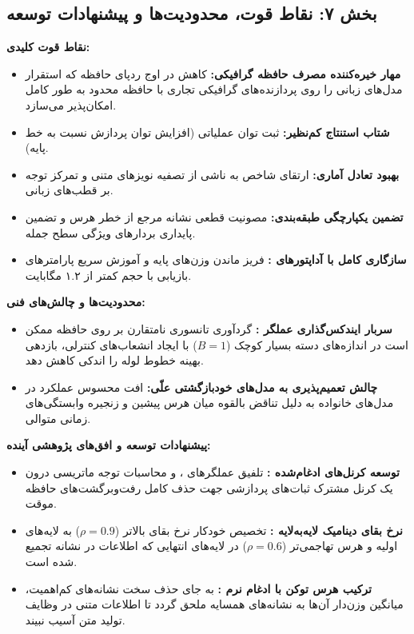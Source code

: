 \subsection*{بخش ۷: نقاط قوت، محدودیت‌ها و پیشنهادات توسعه }

\textbf{نقاط قوت کلیدی:}
\begin{itemize}
    \item \textbf{مهار خیره‌کننده مصرف حافظه گرافیکی:} کاهش  در اوج ردپای حافظه  که استقرار مدل‌های زبانی را روی پردازنده‌های گرافیکی تجاری با حافظه محدود  به طور کامل امکان‌پذیر می‌سازد.
    \item \textbf{شتاب استنتاج کم‌نظیر:} ثبت توان عملیاتی  (افزایش  توان پردازش نسبت به خط پایه).
    \item \textbf{بهبود تعادل آماری:} ارتقای شاخص  به  ناشی از تصفیه نویزهای متنی و تمرکز توجه بر قطب‌های زبانی.
    \item \textbf{تضمین یکپارچگی طبقه‌بندی:} مصونیت قطعی نشانه مرجع \lr{[CLS]} از خطر هرس و تضمین پایداری بردارهای ویژگی سطح جمله.
    \item \textbf{سازگاری کامل با آداپتورهای :} فریز ماندن وزن‌های پایه و آموزش سریع پارامترهای بازیابی با حجم کمتر از ۱.۲ مگابایت.
\end{itemize}

\textbf{محدودیت‌ها و چالش‌های فنی:}
\begin{itemize}
    \item \textbf{سربار ایندکس‌گذاری عملگر :} گردآوری تانسوری نامتقارن بر روی حافظه ممکن است در اندازه‌های دسته بسیار کوچک ($B=1$) با ایجاد انشعاب‌های کنترلی، بازدهی بهینه خطوط لوله  را اندکی کاهش دهد.
    \item \textbf{چالش تعمیم‌پذیری به مدل‌های خودبازگشتی علّی:} افت محسوس عملکرد در مدل‌های خانواده  به دلیل تناقض بالقوه میان هرس پیشین و زنجیره وابستگی‌های زمانی متوالی.
\end{itemize}

\textbf{پیشنهادات توسعه و افق‌های پژوهشی آینده:}
\begin{itemize}
    \item \textbf{توسعه کرنل‌های ادغام‌شده :} تلفیق عملگرهای ،  و محاسبات توجه ماتریسی درون یک کرنل مشترک ثبات‌های پردازشی جهت حذف کامل رفت‌وبرگشت‌های حافظه موقت.
    \item \textbf{نرخ بقای دینامیک لایه‌به‌لایه :} تخصیص خودکار نرخ بقای بالاتر ($\rho = 0.9$) به لایه‌های اولیه و هرس تهاجمی‌تر ($\rho = 0.6$) در لایه‌های انتهایی که اطلاعات در نشانه \lr{[CLS]} تجمیع شده است.
    \item \textbf{ترکیب هرس توکن با ادغام نرم :} به جای حذف سخت نشانه‌های کم‌اهمیت، میانگین وزن‌دار آن‌ها به نشانه‌های همسایه ملحق گردد تا اطلاعات متنی در وظایف تولید متن آسیب نبیند.
\end{itemize}

